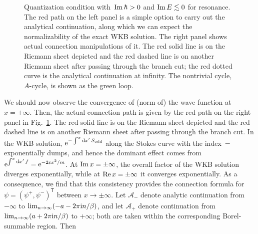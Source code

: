 \begin{figure}[t]
\caption{Quantization condition with~$\operatorname{Im}\hbar>0$ and $\operatorname{Im} E\lesssim0$ for resonance.
The red path on the left panel is a simple option to carry out the analytical continuation,
along which we can expect the normalizability of the exact WKB solution.
The right panel shows actual connection manipulations of it.
The red solid line is on the Riemann sheet depicted and the red dashed line is on another Riemann sheet after passing through the branch cut;
the red dotted curve is the analytical continuation at infinity.
The nontrivial cycle, $A$-cycle, is shown as the green loop.}
\label{src:2505_02301:fig:stokes_graph_path}
\end{figure}
We should now observe the convergence of (norm of) the wave function at~$x=\pm\infty$.
Then, the actual connection path is given by the red path on the right panel in Fig.~\ref{src:2505_02301:fig:stokes_graph_path}.
The red solid line is on the Riemann sheet depicted and the red dashed line is on another Riemann sheet after passing through the branch cut.
In the WKB solution,
$\mathrm{e}^{-\int^x \mathrm{d} x'\, S_{\mathrm{odd}}}$ along the Stokes curve with the index~$-$ exponentially dumps,
and hence the dominant effect comes from~$\mathrm{e}^{\int^x \mathrm{d} x'\, f}=\mathrm{e}^{-2\varepsilon x^2/m}$.
At $\operatorname{Im} x=\pm\infty$, the overall factor of the WKB solution diverges exponentially,
while at $\operatorname{Re} x=\pm\infty$ it converges exponentially.
As a consequence, we find that this consistency provides the connection formula for $\psi=(\psi^{+},\psi^{-})^{\mathsf T}$ between $x\to\pm\infty$.  Let $\mathcal A_-$ denote analytic continuation from $-\infty$ to $\lim_{n\to\infty}(-a-2\pi \mathrm{i} n/\beta)$, and let $\mathcal A_+$ denote continuation from $\lim_{n\to\infty}(a+2\pi \mathrm{i} n/\beta)$ to $+\infty$; both are taken within the corresponding Borel-summable region.  Then
